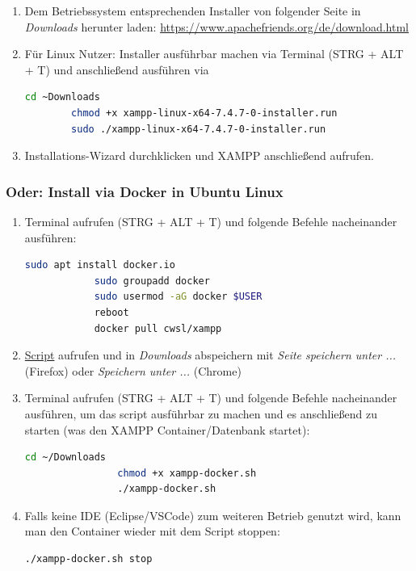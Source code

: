 \documentclass[11pt]{scrartcl}
\begin{document}
\begin{enumerate}
    \item Dem Betriebssystem entsprechenden Installer von folgender Seite in \textit{Downloads}
          herunter laden: \url{https://www.apachefriends.org/de/download.html}
    \item Für Linux Nutzer: Installer ausführbar machen via Terminal (STRG + ALT + T)
          und anschließend ausführen via
          \begin{lstlisting}[language=bash]
        cd ~Downloads
        chmod +x xampp-linux-x64-7.4.7-0-installer.run
        sudo ./xampp-linux-x64-7.4.7-0-installer.run
    \end{lstlisting}
    \item Installations-Wizard durchklicken und XAMPP anschließend aufrufen.
\end{enumerate}

\newpage
\subsubsection{Oder: Install via Docker in Ubuntu Linux}
\label{sec:installviadocker}

\begin{enumerate}
    \item {Terminal aufrufen (STRG + ALT + T) und folgende Befehle nacheinander ausführen:
          \begin{lstlisting}[language=bash]
            sudo apt install docker.io
            sudo groupadd docker
            sudo usermod -aG docker $USER
            reboot
            docker pull cwsl/xampp
        \end{lstlisting}
          }
    \item \href{https://raw.githubusercontent.com/cswl/xampp-docker/master/xampp-docker.sh}{Script}
          aufrufen und in \textit{Downloads} abspeichern mit \textit{Seite speichern unter ...} (Firefox)
          oder \textit{Speichern unter ...} (Chrome)
    \item Terminal aufrufen (STRG + ALT + T) und folgende Befehle nacheinander
          ausführen, um das script ausführbar zu machen und es anschließend
          zu starten (was den XAMPP Container/Datenbank startet):
          \begin{lstlisting}[language=bash]
                cd ~/Downloads
                chmod +x xampp-docker.sh
                ./xampp-docker.sh
            \end{lstlisting}
    \item Falls keine IDE (Eclipse/VSCode) zum weiteren Betrieb genutzt wird, kann man
          den Container wieder mit dem Script stoppen:
          \begin{lstlisting}[language=bash]
        ./xampp-docker.sh stop
    \end{lstlisting}
\end{enumerate}
\end{document}
